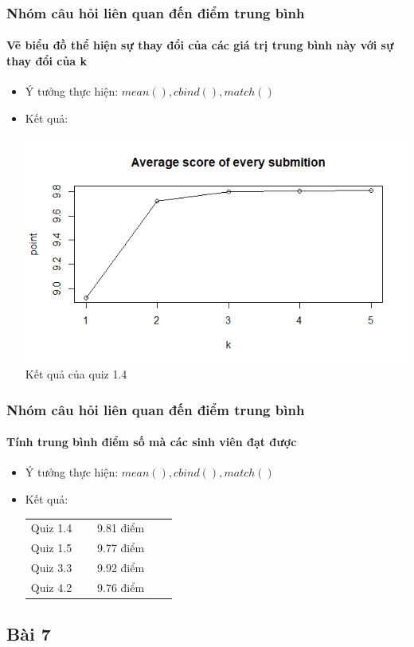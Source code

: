 \documentclass[english,10pt,table]{beamer}
\begin{document}
\frame
{
\frametitle{Nhóm câu hỏi liên quan đến điểm trung bình}
\framesubtitle{Vẽ biểu đồ thể hiện sự thay đổi của các giá trị trung bình này với sự thay đổi của k}
\begin{itemize}
    \item Ý tưởng thực hiện: $mean(), cbind(), match()$
    \item Kết quả:\\
    \begin{center}
        \includegraphics[width = 6 cm]{Images/img5-3-1.png}\\
        Kết quả của quiz 1.4
    \end{center}
\end{itemize}
}

\frame
{
\frametitle{Nhóm câu hỏi liên quan đến điểm trung bình}
\framesubtitle{Tính trung bình điểm số mà các sinh viên đạt được}
\begin{itemize}
    \item Ý tưởng thực hiện: $mean(), cbind(), match()$
    \item Kết quả:\\
    \begin{center}
        \begin{tabular}{l l c c c}
             Quiz 1.4 & $\;$ & 9.81 điểm\\
             Quiz 1.5 & $\;$ & 9.77 điểm\\
             Quiz 3.3 & $\;$ & 9.92 điểm\\
             Quiz 4.2 & $\;$ & 9.76 điểm
        \end{tabular}
    \end{center}
\end{itemize}
}

\subsection{Bài 7}
\end{document}
